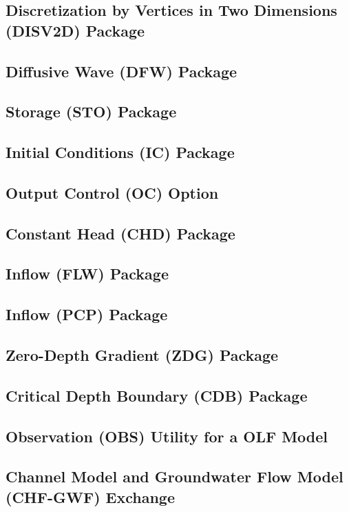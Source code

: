 \newpage
\subsection{Discretization by Vertices in Two Dimensions (DISV2D) Package}


\newpage
\subsection{Diffusive Wave (DFW) Package}


\newpage
\subsection{Storage (STO) Package}


\newpage
\subsection{Initial Conditions (IC) Package}


\newpage
\subsection{Output Control (OC) Option}


\newpage
\subsection{Constant Head (CHD) Package}


\newpage
\subsection{Inflow (FLW) Package}


\newpage
\subsection{Inflow (PCP) Package}


\newpage
\subsection{Zero-Depth Gradient (ZDG) Package}


\newpage
\subsection{Critical Depth Boundary (CDB) Package}


\newpage
\subsection{Observation (OBS) Utility for a OLF Model}


\newpage
\subsection{Channel Model and Groundwater Flow Model (CHF-GWF) Exchange}


